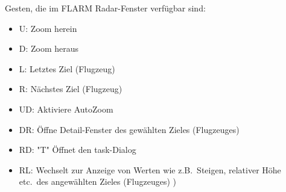 Gesten, die im FLARM Radar-Fenster verfügbar sind:
\begin{itemize}
\item U: Zoom herein
\item D: Zoom heraus
\item L: Letztes Ziel (Flugzeug)
\item R: Nächstes Ziel (Flugzeug)
\item UD: Aktiviere AutoZoom
\item DR: Öffne Detail-Fenster des gewählten Zieles (Flugzeuges)
\item RD: "T" Öffnet den task-Dialog
\item RL: Wechselt zur Anzeige von Werten wie z.B.\ Steigen, relativer Höhe etc.\ des angewählten Zieles (Flugzeuges) )
\end{itemize} 
